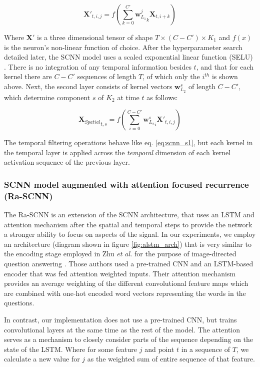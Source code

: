 \documentclass[fleqn,10pt]{wlscirep}
\begin{document}
\begin{equation} \label{eq:scnn_s1}
  \boldsymbol{X'}_{t, i, j} = f\left(\sum_{k=0}^{C'} {\boldsymbol{w}_{L_1}^j}_k \boldsymbol{X}_{t,i+k}\right)
\end{equation}

Where $\boldsymbol{X'}$ is a three dimensional tensor of shape $T \times (C-C') \times K_1$ and $f(x)$ is the neuron's non-linear function of choice. After the hyperparameter search detailed later, the SCNN model uses a scaled exponential linear function (SELU) \cite{NIPS2017_6698}. There is no integration of any temporal information besides $t$, and that for each kernel there are $C-C'$ sequences of length $T$, of which only the $i^{th}$ is shown above. Next, the second layer consists of kernel vectors $\boldsymbol{w}_{L_2}^s$ of length $C-C'$, which determine component $s$ of $K_2$ at time $t$ as follows:

\begin{equation} \label{eq:scnn_s2}
  {\boldsymbol{X}_{Spatial}}_{t, s} = f\left(\sum_{i=0}^{C-C'}{\boldsymbol{w}_{L_2}^s}_i \boldsymbol{X'}_{t, i, j}\right)
\end{equation}

The temporal filtering operations behave like eq. \ref{eq:scnn_s1}, but each kernel in the temporal layer is applied across the {\em temporal} dimension of each kernel activation sequence of the previous layer.

\subsubsection*{SCNN model augmented with attention focused recurrence (Ra-SCNN)} 

The Ra-SCNN is an extension of the SCNN architecture, that uses an LSTM and attention mechanism after the spatial and temporal steps to provide the network a stronger ability to focus on aspects of the signal. In our experiments, we employ an architecture (diagram shown in figure \ref{fig:alstm_arch}) that is very similar to the encoding stage employed in Zhu {\em et al.} for the purpose of image-directed question answering \cite{Zhu}. Those authors used a pre-trained CNN and an LSTM-based encoder that was fed attention weighted inputs. Their attention mechanism provides an average weighting of the different convolutional feature maps which are combined with one-hot encoded word vectors representing the words in the questions.

In contrast, our implementation does not use a pre-trained CNN, but trains convolutional layers at the same time as the rest of the model. The attention serves as a mechanism to closely consider parts of the sequence depending on the state of the LSTM. Where for some feature $j$ and point $t$ in a sequence of $T$, we calculate a new value for $j$ as the weighted sum of entire sequence of that feature.  
\end{document}
